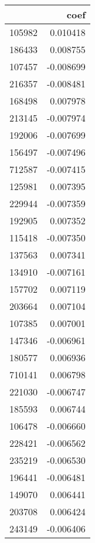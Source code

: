 \begin{tabular}{lr}
\toprule
 & coef \\
\midrule
105982 & 0.010418 \\
186433 & 0.008755 \\
107457 & -0.008699 \\
216357 & -0.008481 \\
168498 & 0.007978 \\
213145 & -0.007974 \\
192006 & -0.007699 \\
156497 & -0.007496 \\
712587 & -0.007415 \\
125981 & 0.007395 \\
229944 & -0.007359 \\
192905 & 0.007352 \\
115418 & -0.007350 \\
137563 & 0.007341 \\
134910 & -0.007161 \\
157702 & 0.007119 \\
203664 & 0.007104 \\
107385 & 0.007001 \\
147346 & -0.006961 \\
180577 & 0.006936 \\
710141 & 0.006798 \\
221030 & -0.006747 \\
185593 & 0.006744 \\
106478 & -0.006660 \\
228421 & -0.006562 \\
235219 & -0.006530 \\
196441 & -0.006481 \\
149070 & 0.006441 \\
203708 & 0.006424 \\
243149 & -0.006406 \\
\bottomrule
\end{tabular}
